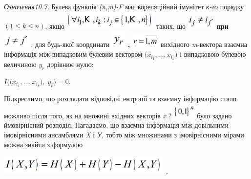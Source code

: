  \textit{Означення10.7.}\textit{ }Булева функція
\textit{(}\textit{n}\textit{,}\textit{m}\textit{)-}\textit{F}  має кореляційний
імунітет  \textit{к-го }порядку  $(1\le k\le n)$, якщо 
\includegraphics[width=1.8598in,height=0.3634in]{crypt-img/crypt-img209.png} 
таких, що 
\includegraphics[width=0.5689in,height=0.3272in]{crypt-img/crypt-img210.png} 
\textbf{при }
\includegraphics[width=0.528in,height=0.2701in]{crypt-img/crypt-img211.png} ,
для будь-якої  координати 
\includegraphics[width=0.2898in,height=0.348in]{crypt-img/crypt-img212.png}
\textbf{, }
\includegraphics[width=0.5583in,height=0.2736in]{crypt-img/crypt-img213.png} 
вихідного \textit{m}{}-вектора  взаємна інформація між випадковим булевим 
вектором  $(x_{i_{{1}}},\dots,x_{i_k}{)}$ і
випадковою булевою величиною  $y_r$ дорівнює нулю:

{\centering
 $I((x_{i_{{1}}},\dots,x_{i_{k}}{),\;y_r}{)=0}$.
\par}

Підкреслимо, що розглядати відповідні ентропії та взаємну інформацію стало
можливо після того, як на множині  вхідних векторів \textit{x} $?$
\includegraphics[width=0.4437in,height=0.3193in]{crypt-img/crypt-img214.png} 
було задано ймовірнісний розподіл. Нагадаємо, що взаємна інформація  між
довільними імовірнісними  ансамблями \textit{X }і \textit{У}, тобто між
множинами з імовірнісними мірами можна знайти з формулою

{\centering\itshape
 \includegraphics[width=3.402in,height=0.3744in]{crypt-img/crypt-img215.png} , 
\par}

